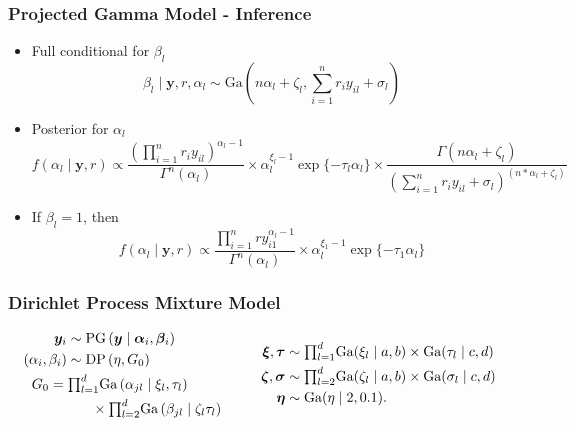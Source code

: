 \documentclass[aspectratio=169]{beamer}
\begin{document}
\begin{frame}
  \frametitle{Projected Gamma Model - Inference}
  \begin{itemize}
    \item Full conditional for $\beta_l$
      \begin{equation*}
        \beta_l\mid \bm{ y}, r, \alpha_l \sim \text{Ga}\left(n\alpha_l + \zeta_l,
                {\textstyle \sum}_{i = 1}^nr_iy_{il} + \sigma_l\right)
      \end{equation*}
    \pause
    \item Posterior for $\alpha_l$
      \begin{equation*}
        f(\alpha_l \mid \bm{ y}, r) \propto
          \frac{\left({\textstyle \prod}_{i = 1}^nr_iy_{il}\right)^{\alpha_l - 1}}{
            \Gamma^n(\alpha_l)} \times \alpha_l^{\xi_l - 1}\exp\{-\tau_l\alpha_l\} \times
            \frac{\Gamma(n\alpha_l + \zeta_l)}{
            \left({\textstyle\sum}_{i = 1}^n r_iy_{il} + \sigma_l
                  \right)^{(n * \alpha_l + \zeta_l)}}
      \end{equation*}
    \pause
    \item If $\beta_l = 1$, then
    \begin{equation*}
      f(\alpha_l \mid \bm{ y}, r) \propto
        \frac{{\textstyle\prod}_{i = 1}^n ry_{i1}^{\alpha_l - 1}}{\Gamma^n(\alpha_l)} \times
        \alpha_l^{\xi_1 - 1}\exp\{-\tau_1\alpha_l\}
    \end{equation*}
  \end{itemize}
\end{frame}

\begin{frame}
  \frametitle{Dirichlet Process Mixture Model}
  \begin{equation*}
    \begin{aligned}
      \bm{ y}_i &\sim \text{PG}\left(\bm{ y}\mid \bm{ \alpha}_i, \bm{ \beta}_i\right)\\
      (\alpha_i,\beta_i) &\sim \text{DP}\left(\eta, G_0\right)\\
      &~\hspace{-1cm}G_0 = {\textstyle\prod}_{l = 1}^d\text{Ga}\left(\alpha_{jl}\mid\xi_{l},\tau_{l}\right)\\
      &~\hspace{0.5cm}\times{\textstyle\prod}_{l=2}^d\text{Ga}\left(\beta_{jl}\mid\zeta_{l}\tau_{l}\right)
    \end{aligned}
    \hspace{1cm}
    \begin{aligned}
      \bm{ \xi},\bm{ \tau} &\sim {\textstyle \prod}_{l = 1}^d \text{Ga}(\xi_l\mid a,b)
              \times \text{Ga}(\tau_l\mid c,d)\\
      \bm{ \zeta},\bm{\sigma} &\sim {\textstyle\prod}_{l = 2}^d\text{Ga}(\zeta_l \mid a,b)
              \times \text{Ga}(\sigma_l\mid c,d)\\
      \bm{ \eta} &\sim \text{Ga}(\eta \mid 2, 0.1).
    \end{aligned}
  \end{equation*}
\end{frame}
\end{document}
